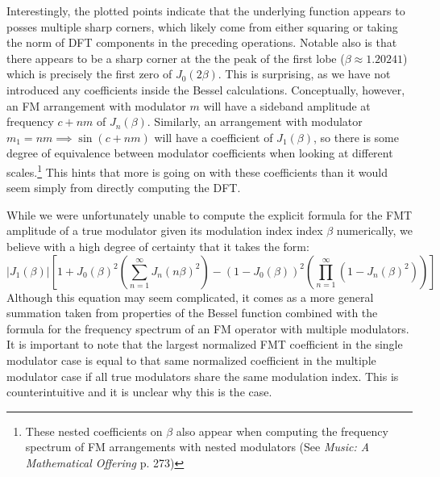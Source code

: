 \documentclass[11pt,twoside]{report}
\numberwithin{thm}{section}
\numberwithin{equation}{section}
\begin{document}
Interestingly, the plotted points indicate that the underlying function appears to posses multiple sharp corners, which likely come from either squaring or taking the norm of DFT components in the preceding operations. Notable also is that there appears to be a sharp corner at the the peak of the first lobe ($\beta \approx 1.20241$) which is precisely the first zero of $J_0(2\beta)$. This is surprising, as we have not introduced any coefficients inside the Bessel calculations. Conceptually, however, an FM arrangement with modulator $m$ will have a sideband amplitude at frequency $c + nm$ of $J_n(\beta)$. Similarly, an arrangement with modulator $m_1 = nm \implies \sin(c+nm)$ will have a coefficient of $J_1(\beta)$, so there is some degree of equivalence between modulator coefficients when looking at different scales.\footnote{These nested coefficients on $\beta$ also appear when computing the frequency spectrum of FM arrangements with nested modulators (See \textit{Music: A Mathematical Offering} p. 273)} This hints that more is going on with these coefficients than it would seem simply from directly computing the DFT.  



While we were unfortunately unable to compute the explicit formula for the FMT amplitude of a true modulator given its modulation index index $\beta$ numerically, we believe with a high degree of certainty that it takes the form:
\begin{equation}
      \left|J_1(\beta)\right|\left[1 + J_0(\beta)^2\left(\sum_{n=1}^\infty J_n(n\beta)^2 \right) -  (1-J_0(\beta))^2\left(\prod_{n=1}^\infty(1-J_n(\beta)^2)\right) \right]
      \label{eq:bigdaddy}
\end{equation}
Although this equation may seem complicated, it comes as a more general summation taken from properties of the Bessel function combined with the formula for the frequency spectrum of an FM operator with multiple modulators. It is important to note that the largest normalized FMT coefficient in the single modulator case is equal to that same normalized coefficient in the multiple modulator case if all true modulators share the same modulation index. This is counterintuitive and it is unclear why this is the case. 
\end{document}
